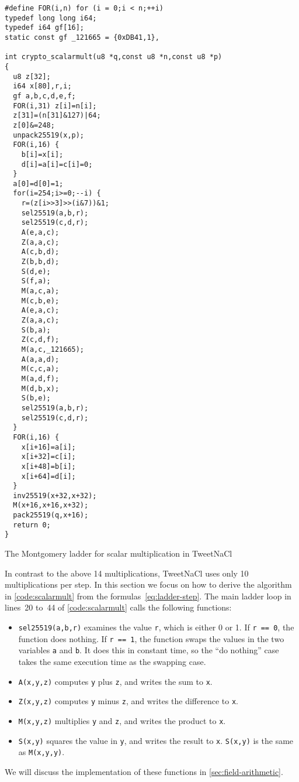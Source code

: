 \documentclass{article}
\begin{document}
\begin{listing}
\begin{verbatim}
#define FOR(i,n) for (i = 0;i < n;++i)
typedef long long i64;
typedef i64 gf[16];
static const gf _121665 = {0xDB41,1},

int crypto_scalarmult(u8 *q,const u8 *n,const u8 *p)
{
  u8 z[32];
  i64 x[80],r,i;
  gf a,b,c,d,e,f;
  FOR(i,31) z[i]=n[i];
  z[31]=(n[31]&127)|64;
  z[0]&=248;
  unpack25519(x,p);
  FOR(i,16) {
    b[i]=x[i];
    d[i]=a[i]=c[i]=0;
  }
  a[0]=d[0]=1;
  for(i=254;i>=0;--i) {
    r=(z[i>>3]>>(i&7))&1;
    sel25519(a,b,r);
    sel25519(c,d,r);
    A(e,a,c);
    Z(a,a,c);
    A(c,b,d);
    Z(b,b,d);
    S(d,e);
    S(f,a);
    M(a,c,a);
    M(c,b,e);
    A(e,a,c);
    Z(a,a,c);
    S(b,a);
    Z(c,d,f);
    M(a,c,_121665);
    A(a,a,d);
    M(c,c,a);
    M(a,d,f);
    M(d,b,x);
    S(b,e);
    sel25519(a,b,r);
    sel25519(c,d,r);
  }
  FOR(i,16) {
    x[i+16]=a[i];
    x[i+32]=c[i];
    x[i+48]=b[i];
    x[i+64]=d[i];
  }
  inv25519(x+32,x+32);
  M(x+16,x+16,x+32);
  pack25519(q,x+16);
  return 0;
}
\end{verbatim}
\caption{The Montgomery ladder for scalar multiplication in TweetNaCl}\label{code:scalarmult}
\end{listing}

In contrast to the above 14 multiplications, TweetNaCl uses only 10 multiplications per step.
In this section we focus on how to derive the algorithm in \autoref{code:scalarmult} from the formulas~\eqref{eq:ladder-step}.
The main ladder loop in lines~20 to~44 of \autoref{code:scalarmult} calls the following functions:
\begin{itemize}
    \item \verb|sel25519(a,b,r)| examines the value \verb|r|, which is either 0 or 1.
        If \verb|r == 0|, the function does nothing.
        If \verb|r == 1|, the function swaps the values in the two variables \verb|a| and \verb|b|.
        It does this in constant time, so the ``do nothing'' case takes the same execution time as the swapping case.
    \item \verb|A(x,y,z)| computes \verb|y| plus \verb|z|, and writes the sum to \verb|x|.
    \item \verb|Z(x,y,z)| computes \verb|y| minus \verb|z|, and writes the difference to \verb|x|.
    \item \verb|M(x,y,z)| multiplies \verb|y| and \verb|z|, and writes the product to \verb|x|.
    \item \verb|S(x,y)| squares the value in \verb|y|, and writes the result to \verb|x|.
        \verb|S(x,y)| is the same as \verb|M(x,y,y)|.
\end{itemize}
We will discuss the implementation of these functions in \autoref{sec:field-arithmetic}.
\end{document}
